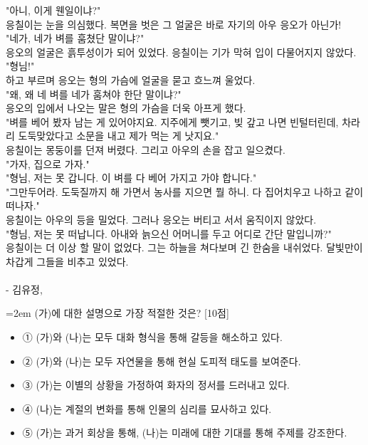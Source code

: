 \documentclass[11pt,a4paper]{article}
\newcommand{\qnum}[1]{%
  \tikz[baseline=(num.base)]{%
    \node[circle, fill=numCircle, text=white, inner sep=0pt,
          minimum size=18pt, font=\small\bfseries] (num) {#1};%
  }%
}
\newcommand{\pts}[1]{%
  \hfill\textcolor{ptsBadge}{[#1점]}%
}
\begin{document}
\begin{tcolorbox}[passage]
"아니, 이게 웬일이냐?" \\{}
응칠이는 눈을 의심했다. 복면을 벗은 그 얼굴은 바로 자기의 아우 응오가 아닌가! \\{}
"네가, 네가 벼를 훔쳤단 말이냐?" \\{}
응오의 얼굴은 흙투성이가 되어 있었다. 응칠이는 기가 막혀 입이 다물어지지 않았다. \\{}
"형님!" \\{}
하고 부르며 응오는 형의 가슴에 얼굴을 묻고 흐느껴 울었다. \\{}
"왜, 왜 네 벼를 네가 훔쳐야 한단 말이냐?" \\{}
응오의 입에서 나오는 말은 형의 가슴을 더욱 아프게 했다. \\{}
"벼를 베어 봤자 남는 게 있어야지요. 지주에게 뺏기고, 빚 갚고 나면 빈털터린데, 차라리 도둑맞았다고 소문을 내고 제가 먹는 게 낫지요." \\{}
응칠이는 몽둥이를 던져 버렸다. 그리고 아우의 손을 잡고 일으켰다. \\{}
"가자, 집으로 가자." \\{}
"형님, 저는 못 갑니다. 이 벼를 다 베어 가지고 가야 합니다." \\{}
"그만두어라. 도둑질까지 해 가면서 농사를 지으면 뭘 하니. 다 집어치우고 나하고 같이 떠나자." \\{}
응칠이는 아우의 등을 밀었다. 그러나 응오는 버티고 서서 움직이지 않았다. \\{}
"형님, 저는 못 떠납니다. 아내와 늙으신 어머니를 두고 어디로 간단 말입니까?" \\{}
응칠이는 더 이상 할 말이 없었다. 그는 하늘을 쳐다보며 긴 한숨을 내쉬었다. 달빛만이 차갑게 그들을 비추고 있었다. \\{}
\vspace{4pt} \\{}
- 김유정,
\end{tcolorbox}
\vspace{3mm}
\begin{minipage}{\columnwidth}
{\hangindent=2em
\qnum{1}\enspace (가)에 대한 설명으로 가장 적절한 것은? \pts{10}
\par}

\vspace{3mm}
\begin{itemize}[leftmargin=2.5em, labelsep=0.3em, label={}, itemsep=4pt, parsep=1pt, topsep=0pt]
  \item ① (가)와 (나)는 모두 대화 형식을 통해 갈등을 해소하고 있다.
  \item ② (가)와 (나)는 모두 자연물을 통해 현실 도피적 태도를 보여준다.
  \item ③ (가)는 이별의 상황을 가정하여 화자의 정서를 드러내고 있다.
  \item ④ (나)는 계절의 변화를 통해 인물의 심리를 묘사하고 있다.
  \item ⑤ (가)는 과거 회상을 통해, (나)는 미래에 대한 기대를 통해 주제를 강조한다.
\end{itemize}
\end{minipage}
\vspace{4mm}
\end{document}
